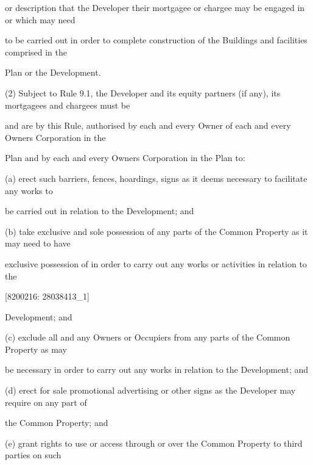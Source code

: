 \documentclass{article}
\begin{document}
{\fontsize{10.02}{1}or description that the Developer their mortgagee or chargee may be engaged in or which may need }

{\fontsize{10.02}{1}to be carried out in order to complete construction of the Buildings and facilities comprised in the }

{\fontsize{10.02}{1}Plan or the Development. }

{\fontsize{9.962}{1}(2) Subject to Rule 9.1, the Developer and its equity partners (if any), its mortgagees and chargees must be }

{\fontsize{10.02}{1}and are by this Rule, authorised by each and every Owner of each and every Owners Corporation in the }

{\fontsize{10.02}{1}Plan and by each and every Owners Corporation in the Plan to: }

{\fontsize{9.962}{1}(a) erect such barriers, fences, hoardings, signs as it deems necessary to facilitate any works to }

{\fontsize{10.02}{1}be carried out in relation to the Development; and }

{\fontsize{9.962}{1}(b) take exclusive and sole possession of any parts of the Common Property as it may need to have }

{\fontsize{10.02}{1}exclusive possession of in order to carry out any works or activities in relation to the }

\newpage
















{\fontsize{7.02}{1}[8200216: 28038413\_1] }

{\fontsize{10.02}{1}Development; and }

{\fontsize{9.962}{1}(c) exclude all and any Owners or Occupiers from any parts of the Common Property as may }


{\fontsize{10.02}{1}be necessary in order to carry out any works in relation to the Development; and }

{\fontsize{9.962}{1}(d) erect for sale promotional advertising or other signs as the Developer may require on any part of }

{\fontsize{10.02}{1}the Common Property; and }

{\fontsize{9.962}{1}(e) grant rights to use or access through or over the Common Property to third parties on such }
\end{document}
